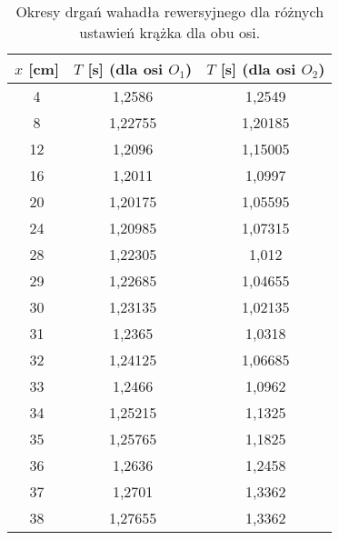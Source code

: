 \documentclass[a4paper,12pt]{article}
\begin{document}
\begin{table}[H]
    \centering
    \begin{tabular}{|c|c|c|}
        \toprule
        $x$ [cm] & $T$ [s] (dla osi $O_1$) & $T$ [s] (dla osi $O_2$) \\
        \midrule
        4  & 1,2586  & 1,2549  \\
          \hline
        8  & 1,22755 & 1,20185 \\
          \hline
        12 & 1,2096  & 1,15005 \\
          \hline
        16 & 1,2011  & 1,0997  \\
          \hline
        20 & 1,20175 & 1,05595 \\
          \hline
        24 & 1,20985 & 1,07315 \\
          \hline
        28 & 1,22305 & 1,012   \\
          \hline
        29 & 1,22685 & 1,04655 \\
          \hline
        30 & 1,23135 & 1,02135 \\
          \hline
        31 & 1,2365  & 1,0318  \\
          \hline
        32 & 1,24125 & 1,06685 \\
          \hline
        33 & 1,2466  & 1,0962  \\
          \hline
        34 & 1,25215 & 1,1325  \\
          \hline
        35 & 1,25765 & 1,1825  \\
          \hline
        36 & 1,2636  & 1,2458  \\
          \hline
        37 & 1,2701  & 1,3362  \\
          \hline
        38 & 1,27655 & 1,3362  \\
          \hline
    \end{tabular}
    \caption{Okresy drgań wahadła rewersyjnego dla różnych ustawień krążka dla obu osi.}
    \label{tab:okresy}
\end{table}
\end{document}
